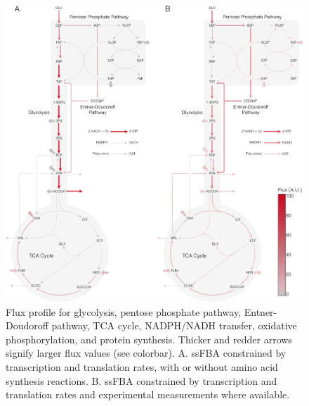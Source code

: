 \documentclass[12pt]{article}
\begin{document}
\begin{figure}[ht]
\centering
\includegraphics[width=1.00\textwidth]{./Figures/NetworkFlux.pdf}
\caption{Flux profile for glycolysis, pentose phosphate pathway, Entner-Doudoroff pathway, TCA cycle, NADPH/NADH transfer, oxidative phosphorylation, and protein synthesis. Thicker and redder arrows signify larger flux values (see colorbar). A. ssFBA constrained by transcription and translation rates, with or without amino acid synthesis reactions. B. ssFBA constrained by transcription and translation rates and experimental measurements where available.}
\label{fig:NetworkFlux}
\end{figure}
\end{document}
